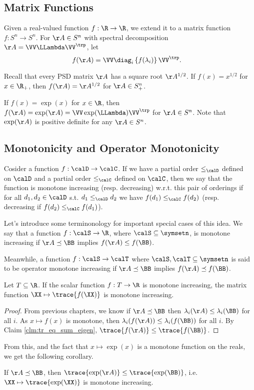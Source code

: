 \subsection{Matrix Functions}
\begin{definition}
  Given a real-valued function $f:\R\to\R$, we extend it to a matrix function $f:S^n\to S^n$.
  For $\AA\in S^n$ with spectral decomposition $\AA=\VV\LLambda\VV^\trp$, let
  \[ f(\AA) = \VV \diag_i\left\{f(\lambda_i)\right\} \VV^\trp. \]
\end{definition}
\begin{example}
  Recall that every PSD matrix $\AA$ has a square root $\AA^{1/2}$.
  If $f(x) = x^{1/2}$ for $x\in\R_+$, then $f(\AA)=\AA^{1/2}$ for $\AA\in S^n_+$.
\end{example}
\begin{example}
  If $f(x) = \exp(x)$ for $x\in\R$, then $f(\AA) = \exp(\AA) = \VV\exp(\LLambda)\VV^\trp$ for $\AA\in S^n$.
  Note that $\exp(\AA)$ is positive definite for any $\AA\in S^n$.
\end{example}

\subsection{Monotonicity and Operator Monotonicity}
 Cosider a function $f:
 \calD \to \calC$.
 If we have a partial order $\leq_{\calD}$ defined on $\calD$ and a
 partial order $\leq_{\calC}$ defined on $\calC$, then we say that
 the function is monotone increasing (resp. decreasing) w.r.t. this pair of orderings if for all $d_1, d_2
 \in \calD$ s.t. $d_1 \leq_{\calD} d_2$ we have $f(d_1) \leq_{\calC}
 f(d_2) $ (resp. decreasing if $f(d_2) \leq_{\calC} f(d_1)$).

Let's  introduce some terminonology for important special cases of this idea.
We say that a function $f : \calS \to \R$, where $\calS \subseteq \symsetn$,
  is monotone increasing if $\AA \preceq \BB$ implies $f(\AA) \leq f(\BB)$.

  Meanwhile, a function $f : \calS \to \calT$ where $\calS, \calT \subseteq \symsetn$
  is said to be operator monotone increasing if $\AA \preceq \BB $ implies
  $f(\AA) \preceq f(\BB)$.
%
\begin{lemma}
  Let $T \subseteq \R$.
  If the scalar function $f : T \to \R$ is monotone increasing, the matrix
  function $\XX \mapsto \trace{f(\XX)}$ is monotone increasing.
\end{lemma}
\begin{proof}
  From previous chapters, we know if $\AA\preceq\BB$ then $\lambda_i(\AA)\leq\lambda_i(\BB)$ for all $i$.
  As $x \mapsto f(x)$ is monotone, then $\lambda_i(f(\AA))\leq\lambda_i(f(\BB))$ for all $i$.
  By Claim \ref{clm:tr_eq_sum_eigen}, $\trace{f(\AA)}\leq\trace{f(\BB)}$.
\end{proof}
From this, and the fact that $x \mapsto \exp(x)$ is a monotone function on the
reals, we get the following corollary.
\begin{corollary}\label{cor:trexpmono}
  If $\AA\preceq\BB$, then $\trace{\exp(\AA)}\leq\trace{\exp(\BB)}$,
  i.e. $\XX \mapsto \trace{\exp(\XX)}$ is monotone increasing.
\end{corollary}

